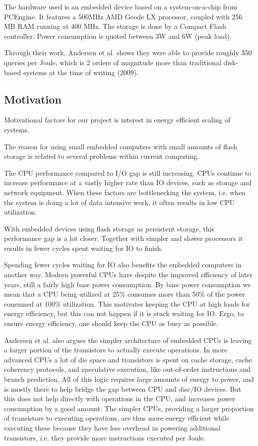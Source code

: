 The hardware used is an embedded device based on a system-on-a-chip from PCEngine. It features a 500MHz AMD Geode LX processor, coupled with 256 MB RAM running at 400 MHz. The storage is done by a Compact Flash controller. Power consumption is quoted between 3W and 6W (peak load).

Through their work, Andersen et al.\cite{fawn} shows they were able to provide roughly 350 queries per Joule, which is 2 orders of magnitude more than traditional disk-based systems at the time of writing (2009). 

\subsection{Motivation}
Motivational factors for our project is interest in energy efficient scaling of systems.

The reason for using small embedded computers with small amounts of flash storage is related to several problems within current computing.

The CPU performance compared to I/O gap is still increasing. CPUs continue to increase performance at a vastly higher rate than IO devices, such as storage and network equipment.
When these factors are bottlenecking the system, i.e. when the system is doing a lot of data intensive work, it often results in low CPU utilization.

With embedded devices using flash storage as persistent storage, this performance gap is a lot closer.
Together with simpler and slower processors it results in fewer cycles spent waiting for IO to finish.

Spending fewer cycles waiting for IO also benefits the embedded computers in another way. Modern powerful CPUs have despite the improved efficiency of later years, still a fairly high base power consumption.
By base power consumption we mean that a CPU being utilized at 25\% consumes more than 50\% of the power consumed at 100\% utilization. 
This motivates keeping the CPU at high loads for energy efficiency, but this can not happen if it is stuck waiting for IO.
Ergo, to ensure energy efficiency, one should keep the CPU as busy as possible.

Andersen et al.\cite{fawn} also argues the simpler architecture of embedded CPUs is leaving a larger portion of the transistors to actually execute operations.
In more advanced CPUs a lot of die space and transistors is spent on cache storage, cache coherency protocols, and speculative execution, like out-of-order instructions and branch prediction.
All of this logic requires large amounts of energy to power, and is mostly there to help bridge the gap between CPU and disc/IO devices. But this does not help directly with operations in the CPU, and increases power consumption by a good amount.
The simpler CPUs, providing a larger proportion of transistors to executing operations, are thus more energy efficient while executing these because they have less overhead in powering additional transistors, i.e. they provide more instructions executed per Joule.

